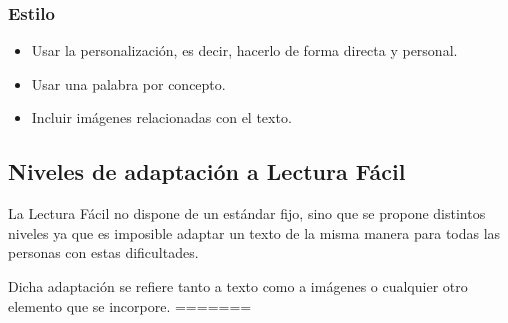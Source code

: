 \subsubsection{Estilo}

\begin{itemize}
	\item Usar la personalización, es decir, hacerlo de forma directa y personal. 

	\item Usar una palabra por concepto.
	

	\item Incluir imágenes relacionadas con el texto.
 \end{itemize}



\subsection{Niveles de adaptación a Lectura Fácil}
La Lectura Fácil no dispone de un estándar fijo, sino que se propone distintos niveles ya que es imposible adaptar un texto de la misma manera para todas las personas con estas dificultades.

Dicha adaptación se refiere tanto a texto como a imágenes o cualquier otro elemento que se incorpore.
=======

